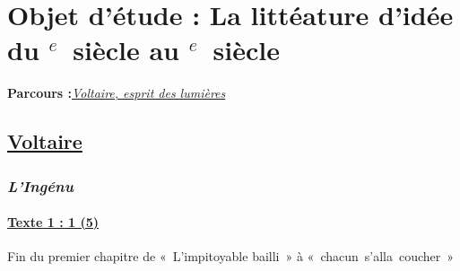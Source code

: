 \documentclass[12pt,a4paper]{article}
\begin{document}
		\section[Voltaire, esprit des Lumi\`eres]{Objet d'\'etude : La litt\'eature d'id\'ee du \textsc{}$^{e}$~siècle au \textsc{}$^{e}$~siècle}
		\textbf{Parcours :}\textit{\underline{Voltaire, esprit des lumi\`eres}}
			\subsection{\href{Bio/Voltaire.pdf}{Voltaire}}
				\subsubsection[L'ing\'enu]{\textit{L'Ing\'enu}}
					\paragraph[Texte 1 (5)]{\textbf{\underline{Texte 1 : 1 (5)}}}
		Fin du premier chapitre de «~L'impitoyable bailli~» \`a «~chacun~s'alla~coucher~»
\end{document}

